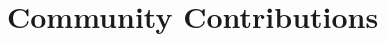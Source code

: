 \documentclass[]{resume-openfont}
\newcommand{\educationHeadingWithGrade}[5]{\runsubsection{#1}\hspace*{\fill}\location{#3 | #4}\\
\textbf{#2} | \textbf{#5}\fakeNewLine}
\newcommand{\projectHeadingWithDate}[4]{\Project{#1}{#2}
\descript{#3 | #4}\\}
\newcommand{\courseWork}[1]{\textbf{Coursework:} #1}
\newcommand{\teacherAssistant}[1]{\textbf{Teacher Assistant (TA):} #1}
\begin{document}




\sectionsep


\section{Community Contributions}
\end{document}
